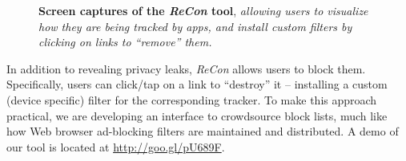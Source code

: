 \begin{figure}[tb]
\hspace{0.1in}
\caption{\textbf{Screen captures of the \emph{ReCon} tool}, \emph{allowing users to visualize how they are being tracked by apps, and install custom filters by clicking on links to ``remove'' them.} }
\label{fig:recon}
\vspace{\postfigspace}
\end{figure}

In addition to revealing privacy leaks, \emph{ReCon} allows users to block them. 
Specifically, users can click/tap on a link to ``destroy'' it -- installing a  custom (device specific) filter for the corresponding tracker. 
To make this approach practical, we are developing an interface to crowdsource block lists, much like how Web browser ad-blocking filters are maintained and distributed. 
A demo of our tool is located at \url{http://goo.gl/pU689F}. 

